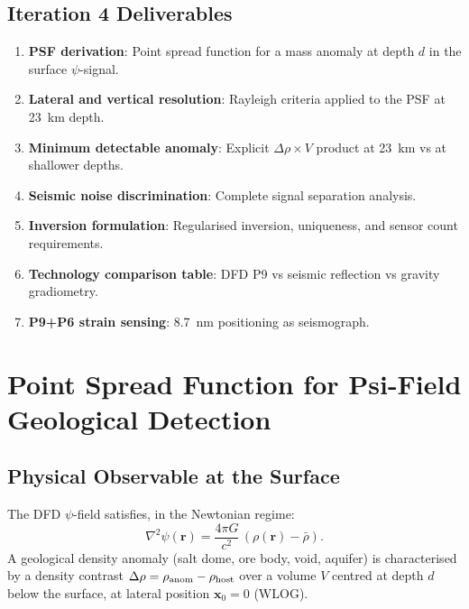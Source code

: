 \documentclass[aps,prd,twocolumn,superscriptaddress,nofootinbib]{revtex4-2}
\newcommand{\drho}{\Delta\rho}
\begin{document}
\subsection{Iteration 4 Deliverables}

\begin{enumerate}
\item \textbf{PSF derivation}: Point spread function for a mass anomaly
  at depth $d$ in the surface $\psi$-signal.
\item \textbf{Lateral and vertical resolution}: Rayleigh criteria applied
  to the PSF at 23~km depth.
\item \textbf{Minimum detectable anomaly}: Explicit $\drho \times V$
  product at 23~km vs at shallower depths.
\item \textbf{Seismic noise discrimination}: Complete signal separation
  analysis.
\item \textbf{Inversion formulation}: Regularised inversion, uniqueness,
  and sensor count requirements.
\item \textbf{Technology comparison table}: DFD P9 vs seismic reflection
  vs gravity gradiometry.
\item \textbf{P9+P6 strain sensing}: 8.7~nm positioning as seismograph.
\end{enumerate}

\section{Point Spread Function for Psi-Field Geological Detection}
\label{sec:psf}

\subsection{Physical Observable at the Surface}

The DFD $\psi$-field satisfies, in the Newtonian regime:
\begin{equation}
  \nabla^2\psi(\mathbf{r}) = \frac{4\pi G}{c^2}\,(\rho(\mathbf{r}) - \bar\rho).
  \label{eq:poisson}
\end{equation}
A geological density anomaly (salt dome, ore body, void, aquifer) is
characterised by a density contrast $\drho = \rho_{\rm anom} - \rho_{\rm host}$
over a volume $V$ centred at depth $d$ below the surface, at lateral
position $\mathbf{x}_0 = 0$ (WLOG).
\end{document}
